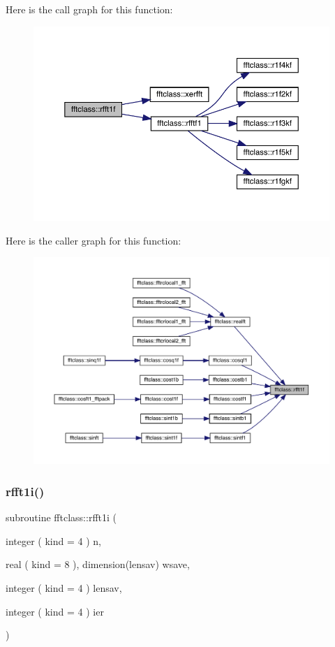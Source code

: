 Here is the call graph for this function\+:\nopagebreak
\begin{figure}[H]
\begin{center}
\leavevmode
\includegraphics[width=350pt]{namespacefftclass_ad5aa2059236e01ea65aecda114c3f45f_cgraph}
\end{center}
\end{figure}
Here is the caller graph for this function\+:\nopagebreak
\begin{figure}[H]
\begin{center}
\leavevmode
\includegraphics[width=350pt]{namespacefftclass_ad5aa2059236e01ea65aecda114c3f45f_icgraph}
\end{center}
\end{figure}
\mbox{\label{namespacefftclass_abb3d8b6f0166090db98de3e7d627434f}} 
\subsubsection{\texorpdfstring{rfft1i()}{rfft1i()}}
{\footnotesize\ttfamily subroutine fftclass\+::rfft1i (\begin{DoxyParamCaption}\item[{integer ( kind = 4 )}]{n,  }\item[{real ( kind = 8 ), dimension(lensav)}]{wsave,  }\item[{integer ( kind = 4 )}]{lensav,  }\item[{integer ( kind = 4 )}]{ier }\end{DoxyParamCaption})}


